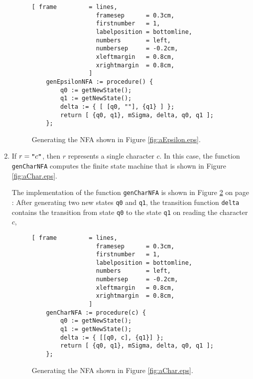 \begin{enumerate}
      
\begin{figure}[!ht]
\centering
\begin{Verbatim}[ frame         = lines, 
                  framesep      = 0.3cm, 
                  firstnumber   = 1,
                  labelposition = bottomline,
                  numbers       = left,
                  numbersep     = -0.2cm,
                  xleftmargin   = 0.8cm,
                  xrightmargin  = 0.8cm,
                ]
    genEpsilonNFA := procedure() {
        q0 := getNewState();
        q1 := getNewState();
        delta := { [ [q0, ""], {q1} ] };
        return [ {q0, q1}, mSigma, delta, q0, q1 ];
    };
\end{Verbatim}
\vspace*{-0.3cm}
\caption{Generating the NFA shown in Figure \ref{fig:aEpsilon.eps}.}
\label{fig:regexp-2-nfa.stlx:genEpsilonNFA}
\end{figure}

\item If $r = \texttt{\symbol{34}}c\texttt{\symbol{34}}$, then $r$ represents a single character $c$.
      In this case, the function \texttt{genCharNFA} computes the finite state
      machine that is shown in Figure \ref{fig:aChar.eps}.

      The implementation of the function \texttt{genCharNFA} is shown in Figure
      \ref{fig:regexp-2-nfa.stlx:genCharNFA} on page \pageref{fig:regexp-2-nfa.stlx:genCharNFA}:
      After generating  two new states \texttt{q0} and \texttt{q1},   the transition function
      \texttt{delta} contains the transition from state \texttt{q0} to the state \texttt{q1} on
      reading the character $c$,



\begin{figure}[!ht]
\centering
\begin{Verbatim}[ frame         = lines, 
                  framesep      = 0.3cm, 
                  firstnumber   = 1,
                  labelposition = bottomline,
                  numbers       = left,
                  numbersep     = -0.2cm,
                  xleftmargin   = 0.8cm,
                  xrightmargin  = 0.8cm,
                ]
    genCharNFA := procedure(c) {
        q0 := getNewState();
        q1 := getNewState();
        delta := { [[q0, c], {q1}] };
        return [ {q0, q1}, mSigma, delta, q0, q1 ];
    };
\end{Verbatim}
\vspace*{-0.3cm}
\caption{Generating the NFA shown in Figure \ref{fig:aChar.eps}.}
\label{fig:regexp-2-nfa.stlx:genCharNFA}
\end{figure}


\end{enumerate}
